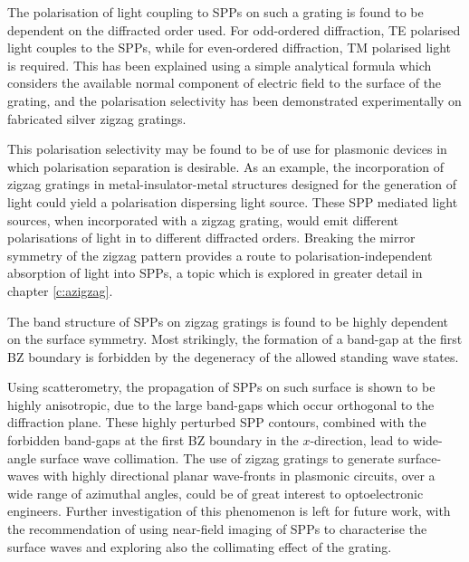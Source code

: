 The polarisation of light coupling to SPPs on such a grating is found to be dependent on the diffracted order used. For odd-ordered diffraction, TE polarised light couples to the SPPs, while for even-ordered diffraction, TM polarised light is required. This has been explained using a simple analytical formula which considers the available normal component of electric field to the surface of the grating, and the polarisation selectivity has been demonstrated experimentally on fabricated silver zigzag gratings.

This polarisation selectivity may be found to be of use for plasmonic devices in which polarisation separation is desirable. As an example, the incorporation of zigzag gratings in metal-insulator-metal structures designed for the generation of light could yield a polarisation dispersing light source. These SPP mediated light sources, when incorporated with a zigzag grating, would emit different polarisations of light in to different diffracted orders. Breaking the mirror symmetry of the zigzag pattern provides a route to polarisation-independent absorption of light into SPPs, a topic which is explored in greater detail in chapter \ref{c:azigzag}.

The band structure of SPPs on zigzag gratings is found to be highly dependent on the surface symmetry. Most strikingly, the formation of a band-gap at the first BZ boundary is forbidden by the degeneracy of the allowed standing wave states. 

Using scatterometry, the propagation of SPPs on such surface is shown to be highly anisotropic, due to the large band-gaps which occur orthogonal to the diffraction plane. These highly perturbed SPP contours, combined with the forbidden band-gaps at the first BZ  boundary in the $x$-direction, lead to wide-angle surface wave collimation. The use of zigzag gratings to generate surface-waves with highly directional planar wave-fronts in plasmonic circuits, over a wide range of azimuthal angles, could be of great interest to optoelectronic engineers. Further investigation of this phenomenon is left for future work, with the recommendation of using near-field imaging of SPPs to characterise the surface waves and exploring also the collimating effect of the grating.

